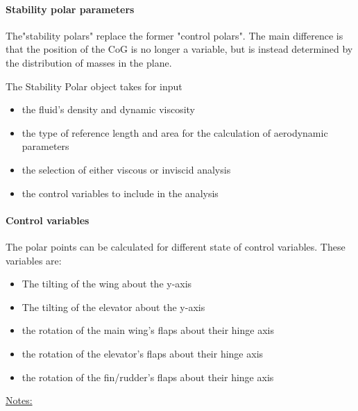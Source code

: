 \documentclass[a4paper,twoside,12pt,dvips]{article}
\begin{document}
\paragraph{Stability polar parameters}

The"stability polars" replace the former "control polars". The
main difference is that the position of the CoG is no longer a
variable, but is instead determined by the distribution of masses in
the plane.

The Stability Polar object takes for input

\begin{itemize}
\item the fluid's density and dynamic viscosity
\item the type of reference length and area for the calculation of
aerodynamic parameters
\item the selection of either viscous or inviscid analysis
\item the control variables to include in the analysis
\end{itemize}

\paragraph{Control variables}

The polar points can be calculated for different state of control
variables. These variables are:

\begin{itemize}
\item The tilting of the wing about the y-axis
\item The tilting of the elevator about the y-axis
\item the rotation of the main wing's flaps about their hinge axis
\item the rotation of the elevator's flaps about their hinge axis
\item the rotation of the fin/rudder's flaps about their hinge axis
\end{itemize}


\underline{Notes:}
\end{document}
